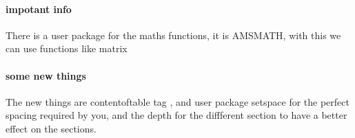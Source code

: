 \documentclass{book}
\begin{document}
\paragraph{impotant info}
There is a user package for the maths functions, it is AMSMATH, with this we can use functions like matrix

\paragraph{some new things}
The new things are contentoftable tag , and user package setspace for the perfect spacing required by you, and the depth for the diffferent section to have a better effect on the sections.
\end{document}
